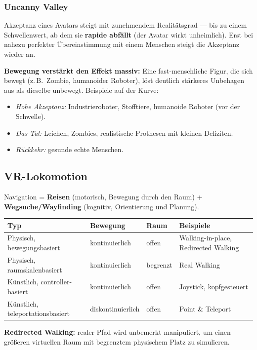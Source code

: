 \documentclass[12pt, a4paper]{article}
\begin{document}
\subsubsection*{Uncanny Valley}

Akzeptanz eines Avatars steigt mit zunehmendem Realitätsgrad — bis zu einem Schwellenwert, ab dem sie \textbf{rapide abfällt} (der Avatar wirkt unheimlich). Erst bei nahezu perfekter Übereinstimmung mit einem Menschen steigt die Akzeptanz wieder an.

\textbf{Bewegung verstärkt den Effekt massiv:} Eine fast-menschliche Figur, die sich bewegt (z.\,B.\ Zombie, humanoider Roboter), löst deutlich stärkeres Unbehagen aus als dieselbe unbewegt. Beispiele auf der Kurve:
\begin{itemize}
  \item \textit{Hohe Akzeptanz:} Industrieroboter, Stofftiere, humanoide Roboter (vor der Schwelle).
  \item \textit{Das Tal:} Leichen, Zombies, realistische Prothesen mit kleinen Defiziten.
  \item \textit{Rückkehr:} gesunde echte Menschen.
\end{itemize}

\subsection{VR-Lokomotion}

Navigation = \textbf{Reisen} (motorisch, Bewegung durch den Raum) + \textbf{Wegsuche/Wayfinding} (kognitiv, Orientierung und Planung).

\begin{center}
\begin{tabular}{llll}
  \textbf{Typ} & \textbf{Bewegung} & \textbf{Raum} & \textbf{Beispiele} \\
  \hline
  Physisch, bewegungsbasiert & kontinuierlich & offen & Walking-in-place, Redirected Walking \\
  Physisch, raumskalenbasiert & kontinuierlich & begrenzt & Real Walking \\
  Künstlich, controller-basiert & kontinuierlich & offen & Joystick, kopfgesteuert \\
  Künstlich, teleportationsbasiert & diskontinuierlich & offen & Point \& Teleport \\
\end{tabular}
\end{center}

\textbf{Redirected Walking:} realer Pfad wird unbemerkt manipuliert, um einen größeren virtuellen Raum mit begrenztem physischem Platz zu simulieren.
\end{document}
